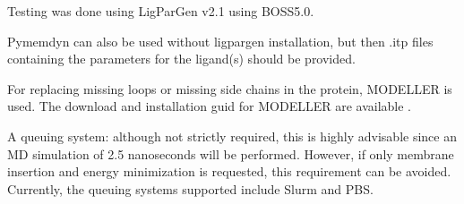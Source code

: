 \documentclass[letterpaper,10pt,english]{sphinxmanual}
\begin{document}
\sphinxAtStartPar
Testing was done using LigParGen v2.1 using BOSS5.0.

\sphinxAtStartPar
Pymemdyn can also be used without ligpargen installation, but then .itp
files containing the parameters for the ligand(s) should be provided.

\begin{DUlineblock}{0em}
\item[] 
\item[] For replacing missing loops or missing side chains in the protein,
MODELLER is used. The download and installation guid for MODELLER
are available
.
\end{DUlineblock}

\begin{DUlineblock}{0em}
\item[] 
\item[] A queuing system: although not strictly required, this is highly
advisable since an MD simulation of 2.5 nanoseconds will be
performed. However, if only membrane insertion and energy
minimization is requested, this requirement can be avoided.
Currently, the queuing systems supported include Slurm and PBS.
\end{DUlineblock}
\end{document}
